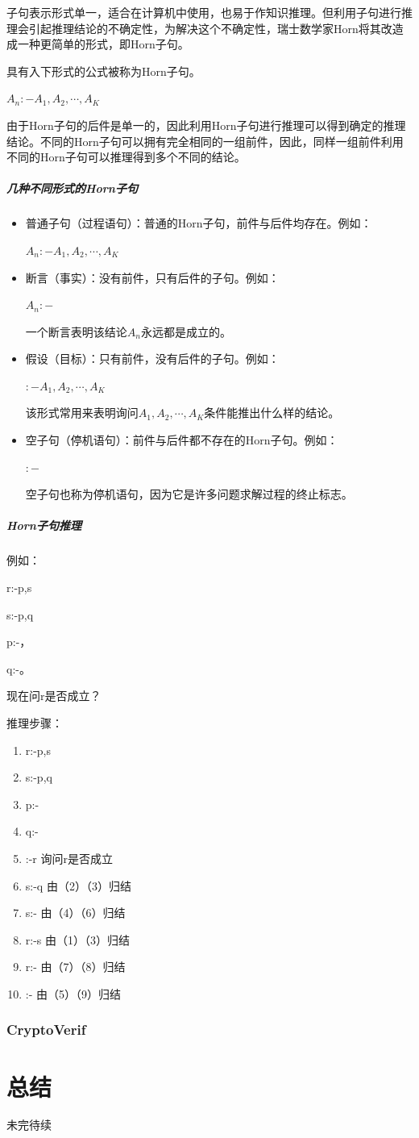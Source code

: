 \documentclass[cs4size,a4pape,UTF8]{ctexart}
\numberwithin{equation}{section}
\numberwithin{table}{section}
\numberwithin{figure}{section}
\begin{document}
子句表示形式单一，适合在计算机中使用，也易于作知识推理。但利用子句进行推理会引起推理结论的不确定性，为解决这个不确定性，瑞士数学家Horn将其改造成一种更简单的形式，即Horn子句。

\begin{definition}
\label{horn}
具有入下形式的公式被称为Horn子句。

$A_{n}:-A_{1},{A_{2}},\cdots,{A_{K}}$
\end{definition}

由于Horn子句的后件是单一的，因此利用Horn子句进行推理可以得到确定的推理结论。不同的Horn子句可以拥有完全相同的一组前件，因此，同样一组前件利用不同的Horn子句可以推理得到多个不同的结论。

\subparagraph{几种不同形式的Horn子句}
\begin{itemize}
\item 普通子句（过程语句）：普通的Horn子句，前件与后件均存在。例如：

$A_{n}:-A_{1},{A_{2}},\cdots,{A_{K}}$

\item 断言（事实）：没有前件，只有后件的子句。例如：

$A_{n}:-$

一个断言表明该结论$A_{n}$永远都是成立的。
\item 假设（目标）：只有前件，没有后件的子句。例如：

$:-A_{1},{A_{2}},\cdots,{A_{K}}$

该形式常用来表明询问$A_{1},{A_{2}},\cdots,{A_{K}}$条件能推出什么样的结论。
\item 空子句（停机语句）：前件与后件都不存在的Horn子句。例如：

$:-$

空子句也称为停机语句，因为它是许多问题求解过程的终止标志。

\end{itemize}

\subparagraph{Horn子句推理}
例如：

r:-p,s

s:-p,q

p:-，

q:-。

现在问r是否成立？

推理步骤：

\begin{enumerate}[(1)]
\item r:-p,s
\item s:-p,q
\item p:-
\item q:-
\item :-r  询问r是否成立
\item s:-q  由（2）（3）归结
\item s:-   由（4）（6）归结
\item r:-s  由（1）（3）归结
\item r:-  由（7）（8）归结
\item :-  由（5）（9）归结\cite{hornclause}
\end{enumerate}

\subsubsection{CryptoVerif}
\section{总结}
未完待续

\clearpage
\end{document}
